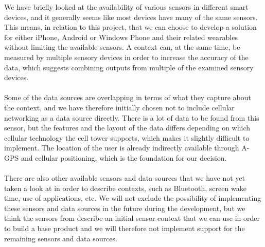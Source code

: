 We have briefly looked at the availability of various sensors in different smart devices, and it generally seems like most devices have many of the same sensors. This means, in relation to this project, that we can choose to develop a solution for either iPhone, Android or Windows Phone and their related wearables without limiting the available sensors. A context can, at the same time, be measured by multiple sensory devices in order to increase the accuracy of the data, which suggests combining outputs from multiple of the examined sensory devices. 
\\\\
Some of the data sources are overlapping in terms of what they capture about the context, and we have therefore initially chosen not to include cellular networking as a data source directly. There is a lot of data to be found from this sensor, but the features and the layout of the data differs depending on which cellular technology the cell tower supports, which makes it slightly difficult to implement. The location of the user is already indirectly available through A-GPS and cellular positioning, which is the foundation for our decision.
\\\\
There are also other available sensors and data sources that we have not yet taken a look at in order to describe contexts, such as Bluetooth, screen wake time, use of applications, etc. We will not exclude the possibility of implementing these sensors and data sources in the future during the development, but we think the sensors from  describe an initial sensor context that we can use in order to build a base product and we will therefore not implement support for the remaining sensors and data sources.  